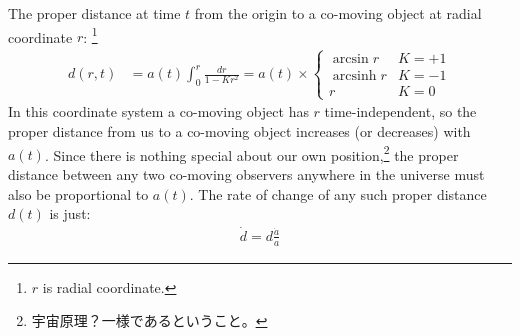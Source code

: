 \documentclass[11pt,a4paper,dvipdfmx]{jsarticle}
\theoremstyle{plain}
\theoremstyle{break}
\DeclareMathOperator{\arcsinh}{arcsinh}
\begin{document}
The proper distance at time $t$ from the origin to a co-moving object at radial coordinate $r$:
\footnote{$r$ is radial coordinate.}
\begin{align}
  d(r,t)
  &= a(t) \int_0^r \frac{dr}{1-Kr^2}
    =a(t)\times
  		\begin{cases}
                  \arcsin r  & K=+1\\
                  \arcsinh r & K=-1\\
                  r              & K=0
               \end{cases}
\end{align}
In this coordinate system a co-moving object has $r$ time-independent, so the proper distance from us to a co-moving object increases (or decreases) with $a(t)$.
Since there is nothing special about our own position,\footnote{宇宙原理？一様であるということ。} the proper distance between any two co-moving observers anywhere in the universe must also be proportional to $a(t)$.
The rate of change of any such proper distance $d(t)$ is just:
\begin{align}
  \dot{d} = d\frac{\dot{a}}{a}
\end{align}
\end{document}
